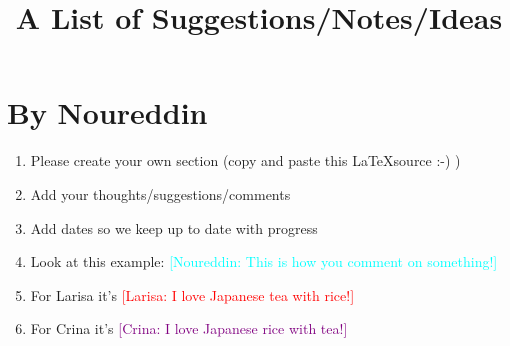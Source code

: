 \documentclass[a4paper,12pt, english]{article}
\newcommand{\kibitz}[2]{\ifnum\Comments=1\textcolor{#1}{#2}\fi}
\newcommand{\ls}[1]{\kibitz{red}      {[Larisa: #1]}}
\newcommand{\cg}[1]  {\kibitz{purple}   {[Crina: #1]}}
\newcommand{\ns}[1]{\kibitz{cyan}     {[Noureddin: #1]}}
\begin{document}
\title{A List of Suggestions/Notes/Ideas}

\large
\section{By Noureddin}
\begin{enumerate}
	\item Please create your own section (copy and paste this \LaTeX  source :-) )
	\item Add your thoughts/suggestions/comments
	\item Add dates so we keep up to date with progress
	\item Look at this example: \ns{This is how you comment on something!}
	\item For Larisa it's \ls{I love Japanese tea with rice!}
	\item For Crina it's  \cg{I love Japanese rice with tea!}
\end{enumerate}    


		
\end{document}
